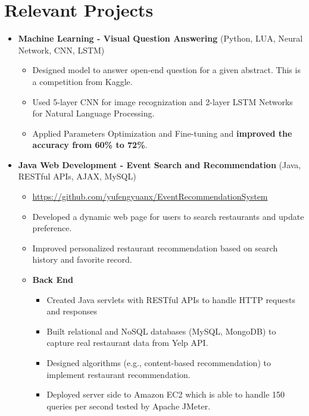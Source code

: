\documentclass[letterpaper,10pt]{article}
\newcommand{\webSiteLink}[2]{#1\hspace{0.3em} \href{#2}{#2}}
\begin{document}
\section{Relevant Projects}
\begin{itemize}\setlength\itemindent{-0.2in}
	\item [] \textbf{Machine Learning - Visual Question Answering} (Python, LUA, Neural Network, CNN, LSTM)
	\setlength\itemsep{0em}
	\begin{itemize}[topsep=-1em]
	\setlength\itemindent{-0.25in}  %
	\setlength\itemsep{-0.1em} %
		\item [\textbullet]Designed model to answer open-end question for a given abstract. This is a competition from Kaggle.
		\item [\textbullet]Used 5-layer CNN for image recognization and 2-layer LSTM Networks for Natural Language Processing.
		\item [\textbullet]Applied Parameters Optimization and Fine-tuning and \textbf{improved the accuracy from 60\% to 72\%}.
	\end{itemize}
	
	
	\item [] \textbf{Java Web Development - Event Search and Recommendation} (Java, RESTful APIs, AJAX, MySQL)
	\setlength\itemsep{0em}
	\begin{itemize}[topsep=-1em]
	\setlength\itemindent{-0.25in}  %
	\setlength\itemsep{-0.1em} %
		\item [] \webSiteLink{\faGithub}{https://github.com/yufengyuanx/EventRecommendationSystem}
		\item [\textbullet] Developed a dynamic web page for users to search restaurants and update preference.
		\item [\textbullet] Improved personalized restaurant recommendation based on search history and favorite record. \\
		
		\item[] \textbf{Back End}
			\begin{itemize}[topsep=-1em]
				\item[\textbullet] Created Java servlets with RESTful APIs to handle HTTP requests and responses
				\item[\textbullet] Built relational and NoSQL databases (MySQL, MongoDB) to capture real restaurant data from Yelp API.
				\item[\textbullet] Designed algorithms (e.g., content-based recommendation) to implement restaurant recommendation.
				\item[\textbullet] Deployed server side to Amazon EC2 which is able to handle 150 queries per second tested by Apache JMeter.
			\end{itemize}
		

\end{itemize}
\end{itemize}
\end{document}
